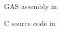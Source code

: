 \documentclass{article}
\begin{document}
\begin{figure}[h]

\caption{GAS assembly in \stylename}
\end{figure}

\begin{figure}[h]

\caption{C source code in \stylename}
\end{figure}
\end{document}
